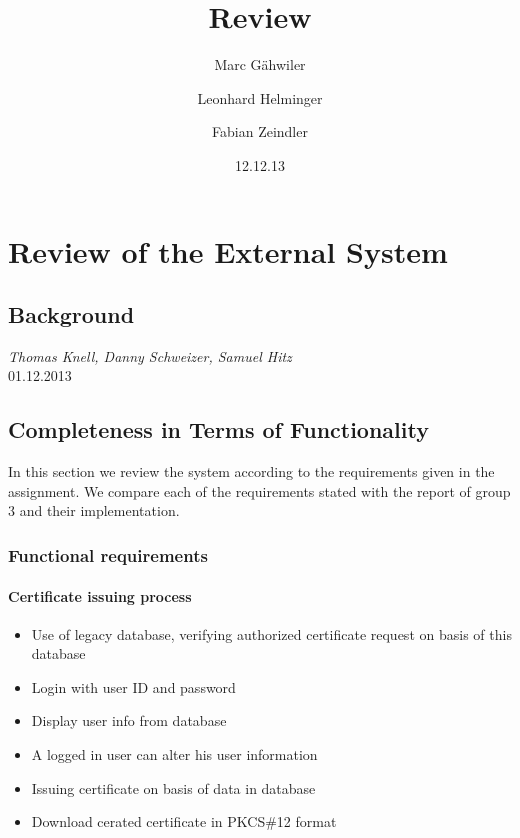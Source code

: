 \documentclass{report}
\title{\huge\sffamily\bfseries Review}
\author{Marc G\"ahwiler \and Leonhard Helminger \and Fabian Zeindler}
\date{12.12.13}
\begin{document}
\maketitle

\tableofcontents
\pagebreak



\chapter{Review of the External System}

\section{Background}

 {\it Thomas Knell, Danny Schweizer, Samuel Hitz} \\

 01.12.2013

\section{Completeness in Terms of Functionality} 
In this section we review the system according to the requirements given in the assignment. We compare each of the requirements stated with the report of group 3 and their implementation.
\subsection{Functional requirements}
\subsubsection{Certificate issuing process}
\begin{itemize}
\item Use of legacy database, verifying authorized certificate request on basis of this database \checkmark 
\item Login with user ID and password \checkmark
\item Display user info from database \checkmark
\item A logged in user can alter his user information \checkmark
\item Issuing certificate on basis of data in database \checkmark
\item Download cerated certificate in PKCS\#12 format \checkmark
\end{itemize}
\end{document}
